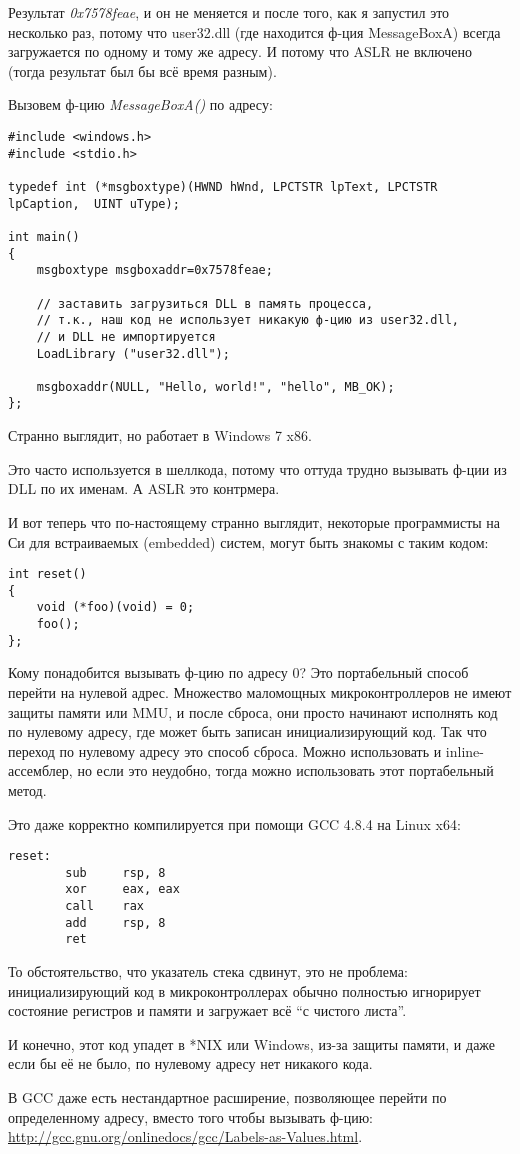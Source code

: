 Результат \emph{0x7578feae}, и он не меняется и после того, как я запустил это несколько раз, потому что
user32.dll (где находится ф-ция MessageBoxA) всегда загружается по одному и тому же адресу.
И потому что \ac{ASLR} не включено (тогда результат был бы всё время разным).

Вызовем ф-цию \emph{MessageBoxA()} по адресу:

\begin{lstlisting}[style=customc]
#include <windows.h>
#include <stdio.h>

typedef int (*msgboxtype)(HWND hWnd, LPCTSTR lpText, LPCTSTR lpCaption,  UINT uType);

int main()
{
	msgboxtype msgboxaddr=0x7578feae;

	// заставить загрузиться DLL в память процесса,
	// т.к., наш код не использует никакую ф-цию из user32.dll, 
	// и DLL не импортируется
	LoadLibrary ("user32.dll");

	msgboxaddr(NULL, "Hello, world!", "hello", MB_OK);
};
\end{lstlisting}

Странно выглядит, но работает в Windows 7 x86.

Это часто используется в шеллкода, потому что оттуда трудно вызывать ф-ции из DLL по их именам.
А \ac{ASLR} это контрмера.

И вот теперь что по-настоящему странно выглядит, некоторые программисты на Си для встраиваемых (embedded) систем, могут быть
знакомы с таким кодом:

\begin{lstlisting}[style=customc]
int reset()
{
	void (*foo)(void) = 0;
	foo();
};
\end{lstlisting}

Кому понадобится вызывать ф-цию по адресу 0?
Это портабельный способ перейти на нулевой адрес.
Множество маломощных микроконтроллеров не имеют защиты памяти или \ac{MMU}, и после сброса, они просто начинают
исполнять код по нулевому адресу, где может быть записан инициализирующий код.
Так что переход по нулевому адресу это способ сброса.
Можно использовать и inline-ассемблер, но если это неудобно, тогда можно использовать этот портабельный метод.

Это даже корректно компилируется при помощи GCC 4.8.4 на Linux x64:

\begin{lstlisting}[style=customasmx86]
reset:
        sub     rsp, 8
        xor     eax, eax
        call    rax
        add     rsp, 8
        ret
\end{lstlisting}

То обстоятельство, что указатель стека сдвинут, это не проблема: инициализирующий код в микроконтроллерах обычно
полностью игнорирует состояние регистров и памяти и загружает всё ``с чистого листа''.

И конечно, этот код упадет в *NIX или Windows, из-за защиты памяти, и даже если бы её не было, по нулевому адресу
нет никакого кода.

В GCC даже есть нестандартное расширение, позволяющее перейти по определенному адресу, вместо того чтобы вызывать ф-цию:
\url{http://gcc.gnu.org/onlinedocs/gcc/Labels-as-Values.html}.

